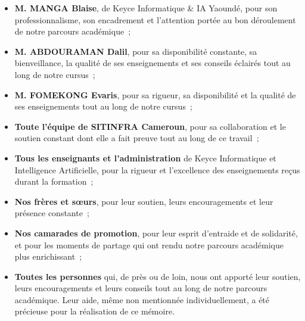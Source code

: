 \begin{itemize}[itemsep=4pt]
  \item \textbf{M. MANGA Blaise},  de Keyce
        Informatique \& IA Yaoundé, pour son professionnalisme, son encadrement
        et l'attention portée au bon déroulement de notre parcours académique~;

  \item \textbf{M. ABDOURAMAN Dalil}, pour sa disponibilité constante, sa
        bienveillance, la qualité de ses enseignements et ses conseils éclairés
        tout au long de notre cursus~;

  \item \textbf{M. FOMEKONG Evaris}, pour sa rigueur, sa disponibilité et la
        qualité de ses enseignements tout au long de notre cursus~;

  \item \textbf{Toute l'équipe de SITINFRA Cameroun}, pour sa collaboration et
        le soutien constant dont elle a fait preuve tout au long de ce travail~;

  \item \textbf{Tous les enseignants et l'administration} de Keyce Informatique
        et Intelligence Artificielle, pour la rigueur et l'excellence des
        enseignements reçus durant la formation~;

  \item \textbf{Nos frères et s\oe urs}, pour leur soutien, leurs
        encouragements et leur présence constante~;

  \item \textbf{Nos camarades de promotion}, pour leur esprit d'entraide et de
        solidarité, et pour les moments de partage qui ont rendu notre parcours
        académique plus enrichissant~;

  \item \textbf{Toutes les personnes} qui, de près ou de loin, nous ont apporté
        leur soutien, leurs encouragements et leurs conseils tout au long de
        notre parcours académique. Leur aide, même non mentionnée
        individuellement, a été précieuse pour la réalisation de ce mémoire.
\end{itemize}

\btpEndMark
\clearpage
